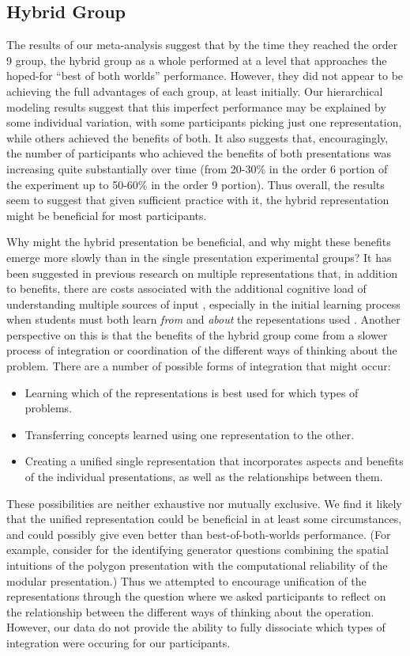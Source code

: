 \documentclass[man,10pt]{apa6}
\begin{document}
\subsection{Hybrid Group}
The results of our meta-analysis suggest that by the time they reached the order 9 group, the hybrid group as a whole performed at a level that approaches the hoped-for ``best of both worlds'' performance. However, they did not appear to be achieving the full advantages of each group, at least initially. Our hierarchical modeling results suggest that this imperfect performance may be explained by some individual variation, with some participants picking just one representation, while others achieved the benefits of both. It also suggests that, encouragingly, the number of participants who achieved the benefits of both presentations was increasing quite substantially over time (from 20-30\% in the order 6 portion of the experiment up to 50-60\% in the order 9 portion). Thus overall, the results seem to suggest that given sufficient practice with it, the hybrid representation might be beneficial for most participants.\par 
Why might the hybrid presentation be beneficial, and why might these benefits emerge more slowly than in the single presentation experimental groups? It has been suggested in previous research on multiple representations that, in addition to benefits, there are costs associated with the additional cognitive load of understanding multiple sources of input \cite{Ainsworth2006}, especially in the initial learning process when students must both learn \emph{from} and \emph{about} the repesentations used \cite{Rau2016}. Another perspective on this is that the benefits of the hybrid group come from a slower process of integration or coordination \cite{Schwartz2015} of the different ways of thinking about the problem. There are a number of possible forms of integration that might occur:
\begin{itemize}
\item Learning which of the representations is best used for which types of problems. 
\item Transferring concepts learned using one representation to the other.
\item Creating a unified single representation that incorporates aspects and benefits of the individual presentations, as well as the relationships between them.  
\end{itemize} 
These possibilities are neither exhaustive nor mutually exclusive. We find it likely that the unified representation could be beneficial in at least some circumstances, and could possibly give even better than best-of-both-worlds performance. (For example, consider for the identifying generator questions combining the spatial intuitions of the polygon presentation with the computational reliability of the modular presentation.) Thus we attempted to encourage unification of the representations through the question where we asked participants to reflect on the relationship between the different ways of thinking about the operation. However, our data do not provide the ability to fully dissociate which types of integration were occuring for our participants. \par
\end{document}
